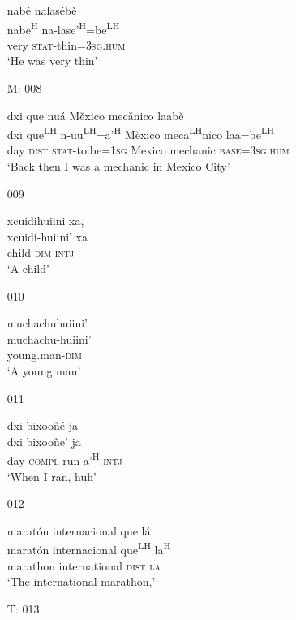 \begin{itemize}
\glll nab\'{e} nalas\'{e}b\v{e} \\
nabe\textsuperscript{H} na-lase'\textsuperscript{H}=be\textsuperscript{LH}  \\
very \textsc{stat}-thin=\textsc{3sg.hum} \\
\glt `He was very thin' 
 

\item[M: 008]
   
\glll dxi que nu\'{a} M\v{e}xico mec\v{a}nico laab\v{e} \\
dxi que\textsuperscript{LH} n-uu\textsuperscript{LH}=a'\textsuperscript{H}  M\v{e}xico meca\textsuperscript{LH}nico laa=be\textsuperscript{LH} \\
day \textsc{dist} \textsc{stat}-to.be=\textsc{1sg} Mexico mechanic \textsc{base}=\textsc{3sg.hum}  \\
\glt `Back then I was a mechanic in Mexico City'
 

\item[009]
   
\glll xcuidihuiini xa, \\
xcuidi-huiini' xa  \\
child-\textsc{dim} \textsc{intj} \\
\glt `A child'
 

\item[010]
   
\glll muchachuhuiini' \\
muchachu-huiini'  \\
young.man-\textsc{dim}  \\
\glt `A young man'
 

\item[011]
  
\glll dxi bixoo\~{n}\'{e} ja \\
dxi bixoo\~{n}e' ja \\
day \textsc{compl}-run-a'\textsuperscript{H} \textsc{intj} \\
\glt `When I ran, huh'
 

\item[012]
  
\glll marat\'{o}n internacional que l\'{a} \\
marat\'{o}n internacional que\textsuperscript{LH} la\textsuperscript{H} \\
marathon	international \textsc{dist} \textsc{la} \\
\glt `The international marathon,'
 

\item[T: 013]
    

\end{itemize}
